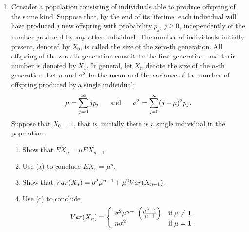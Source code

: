 \documentclass[12pt]{article}%
\newcommand{\0}{{\bf 0}}
\begin{document}
\begin{enumerate}
\item
Consider a population consisting of individuals able to produce offspring of the same kind. 
Suppose that, by the end of its lifetime, each individual will have produced $j$ new offspring 
with probability $p_j$, $j\ge 0$, independently of the number produced by any other individual. 
The number of individuals initially present, denoted by $X_0$, is called 
the size of the zero-th generation. 
All offspring of the zero-th generation constitute the first generation,
and their number is denoted by $X_1$. 
In general,
let $X_n$ denote the size of the $n$-th generation. 
Let $\mu$ and $\si^2$ be 
the mean and the variance of the number of offspring produced by a single individual;
$$
\mu=\sum_{j=0}^\infty jp_j\ \ \ \ \ \mb{and}\ \ \ \ \ 
\si^2=\sum_{j=0}^\infty (j-\mu)^2p_j.
$$
Suppose that $X_0 = 1$, that is, initially there is a single individual in the population.
\begin{enumerate}
\item
Show that $EX_n=\mu EX_{n-1}.$
\item
Use (a) to conclude $EX_n=\mu^n$.
\item
Show that $Var(X_n)=\si^2\mu^{n-1}+\mu^2Var(X_{n-1}).$
\item
Use (c) to conclude 
$$
Var(X_n)=\left\{\ba{ll}
\si^2\mu^{n-1}\left(\f{\mu^n-1}{\mu-1}\right)&\mb{if}\ \mu\neq 1,\\
n\si^2&\mb{if}\ \mu=1.
\ea\right.
$$
\end{enumerate}







\end{enumerate}
\end{document}
